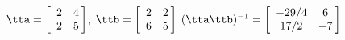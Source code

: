 {$\tta = \left[
\begin{array}{cc}
  2 & 4 \\
 2 & 5
\end{array}\hskip -3pt \right]$, \quad 
$\ttb = \left[
\begin{array}{cc}
  2 & 2 \\
  6 & 5
\end{array} \hskip -3pt
\right]$}
{$(\tta\ttb)^{-1} = \left[
\begin{array}{cc}
 -29/4 & 6\\
 17/2 & -7
\end{array} \hskip -3pt
\right]$}
